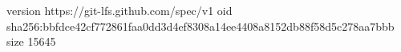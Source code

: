 version https://git-lfs.github.com/spec/v1
oid sha256:bbfdce42cf772861faa0dd3d4ef8308a14ee4408a8152db88f58d5c278aa7bbb
size 15645
